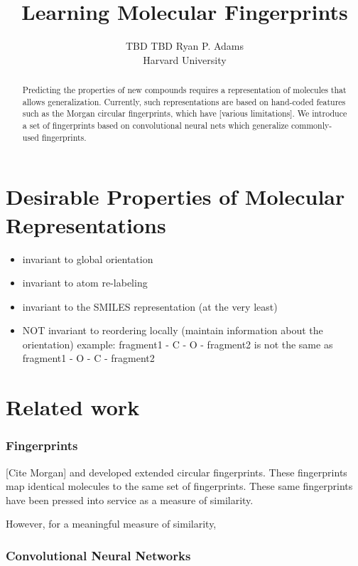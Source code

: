 \documentclass{article}
\title{Learning Molecular Fingerprints}
\author{
TBD
\And
TBD
\And
Ryan P. Adams\\
Harvard University
\And
}
\begin{document}
\maketitle

\begin{abstract}
Predicting the properties of new compounds requires a representation of molecules that allows generalization.
Currently, such representations are based on hand-coded features such as the Morgan circular fingerprints, which have [various limitations].
We introduce a set of fingerprints based on convolutional neural nets which generalize commonly-used fingerprints.
\end{abstract}



\section{Desirable Properties of Molecular Representations}

\begin{itemize}

\item invariant to global orientation
\item invariant to atom re-labeling
\item invariant to the SMILES representation (at the very least)
\item NOT invariant to reordering locally (maintain information about the orientation)
    example:  fragment1 - C - O - fragment2 is not the same as fragment1 - O - C - fragment2 
\end{itemize}




\section{Related work}

\subsubsection{Fingerprints}

[Cite Morgan] and \citet{ECFP2010} developed extended circular fingerprints.
These fingerprints map identical molecules to the same set of fingerprints.
These same fingerprints have been pressed into service as a measure of similarity.

However, for a meaningful measure of similarity, 

\subsubsection{Convolutional Neural Networks}
\end{document}
